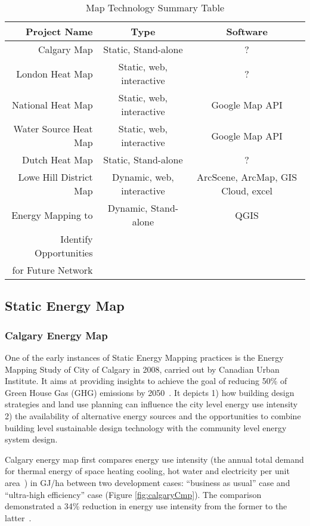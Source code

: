 \documentclass[hidelinks,12pt]{article}
\newcommand{\fref}[1]{Figure \ref{#1}}
\begin{document}
\begin{table}[h!]
  \centering
  \begin{tabular}{r|c| c }
    \hline
Project Name           &Type   & Software \\
    \hline
    \hline
Calgary Map            &Static, Stand-alone &     ?    \\
    \hline
London Heat Map        &Static, web, interactive &     ?    \\
    \hline
National Heat Map      &Static, web, interactive &Google Map API \\
    \hline
Water Source Heat Map  &Static, web, interactive &Google Map API \\
    \hline
Dutch Heat Map         &Static, Stand-alone&     ?    \\
    \hline
Lowe Hill District Map &Dynamic, web, interactive&ArcScene, ArcMap,
                                                   GIS Cloud, excel  \\
    \hline
Energy Mapping to      &Dynamic, Stand-alone&QGIS      \\
Identify Opportunities & &          \\
for Future Network     & &          \\
    \hline
  \end{tabular}
  \caption{Map Technology Summary Table}
  \label{tab:mapSummary}
\end{table}

\subsection{Static Energy Map}\label{staticEnergyMap}
\subsubsection{Calgary Energy Map}
One of the early instances of Static Energy Mapping practices is the
Energy Mapping Study of City of Calgary in 2008, carried out by
Canadian Urban Institute. It aims at providing insights to achieve
the goal of reducing 50\% of Green House Gas (GHG) emissions by
2050~\cite{aacip2009}. It depicts 1) how building design strategies
and land use planning can influence the city level energy use
intensity 2) the availability of alternative energy sources and the
opportunities to combine building level sustainable design technology
with the community level energy system design. 

Calgary energy map first compares energy use intensity (the annual
total demand for thermal energy of space heating cooling, hot water
and electricity per unit area~\cite{aacip2009}) in GJ/ha between two
development cases: ``business as usual'' case and ``ultra-high
efficiency'' case (\fref{fig:calgaryCmp}). The comparison demonstrated
a 34\% reduction in energy use intensity from the former to the
latter~\cite{aacip2009}.
\end{document}
